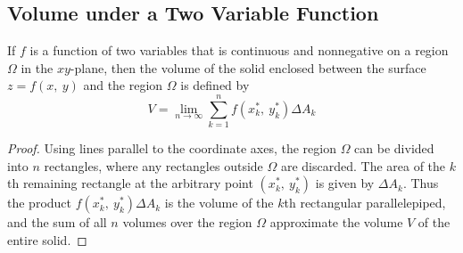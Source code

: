 \documentclass{article}
\begin{document}
\subsection{Volume under a Two Variable Function}
\begin{definition}
    If \(f\) is a function of two variables that is continuous and nonnegative
    on a region \(\Omega\) in the \(xy\)-plane, then the volume of the solid
    enclosed between the surface \(z=f(x,\: y)\) and the region \(\Omega\) is
    defined by
    \begin{equation}\label{eq:volume_under_2d_function}
        V = \lim_{n \to \infty} \sum_{k = 1}^n f(x_k^\ast,\: y_k^\ast) \Delta A_k
    \end{equation}
\end{definition}
\begin{proof}
    Using lines parallel to the coordinate axes, the region \(\Omega\) can be divided
    into \(n\) rectangles, where any rectangles outside \(\Omega\) are discarded.
    The area of the \(k\)th remaining rectangle at the arbitrary point \((x_k^\ast,\: y_k^\ast)\)
    is given by \(\Delta A_k\). Thus the product \(f(x_k^\ast,\: y_k^\ast)\Delta A_k\) is the
    volume of the \(k\)th rectangular parallelepiped, and the sum of all \(n\) volumes over
    the region \(\Omega\) approximate the volume \(V\) of the entire solid.
\end{proof}
\end{document}
